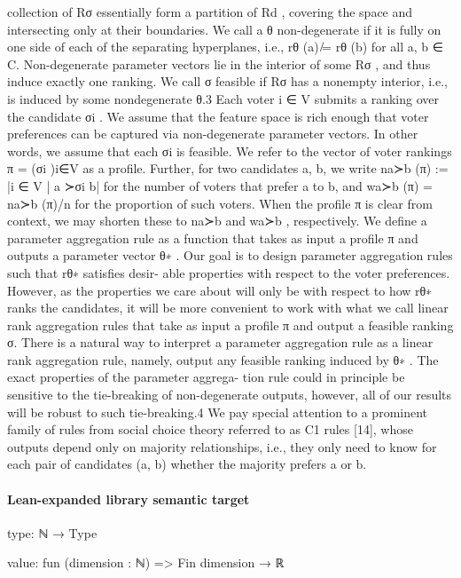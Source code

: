 \documentclass[10pt]{article}
\begin{document}
\begin{ReviewVerbatim}
collection of {Rσ } essentially form a partition of Rd , covering the space and intersecting only at
their boundaries.
We call a θ non-degenerate if it is fully on one side of each of the separating hyperplanes, i.e.,
rθ (a) ̸= rθ (b) for all a, b ∈ C. Non-degenerate parameter vectors lie in the interior of some Rσ ,
and thus induce exactly one ranking. We call σ feasible if Rσ has a nonempty interior, i.e., is induced
by some nondegenerate θ.3
Each voter i ∈ V submits a ranking over the candidate σi . We assume that the feature space is
rich enough that voter preferences can be captured via non-degenerate parameter vectors. In other
words, we assume that each σi is feasible. We refer to the vector of voter rankings π = (σi )i∈V as
a profile. Further, for two candidates a, b, we write na≻b (π) := |{i ∈ V | a ≻σi b}| for the number
of voters that prefer a to b, and wa≻b (π) = na≻b (π)/n for the proportion of such voters. When the
profile π is clear from context, we may shorten these to na≻b and wa≻b , respectively.
We define a parameter aggregation rule as a function that takes as input a profile π and outputs a
parameter vector θ∗ . Our goal is to design parameter aggregation rules such that rθ∗ satisfies desir-
able properties with respect to the voter preferences. However, as the properties we care about will
only be with respect to how rθ∗ ranks the candidates, it will be more convenient to work with what
we call linear rank aggregation rules that take as input a profile π and output a feasible ranking σ.
There is a natural way to interpret a parameter aggregation rule as a linear rank aggregation rule,
namely, output any feasible ranking induced by θ∗ . The exact properties of the parameter aggrega-
tion rule could in principle be sensitive to the tie-breaking of non-degenerate outputs, however, all
of our results will be robust to such tie-breaking.4
We pay special attention to a prominent family of rules from social choice theory referred to as C1
rules [14], whose outputs depend only on majority relationships, i.e., they only need to know for
each pair of candidates (a, b) whether the majority prefers a or b.
\end{ReviewVerbatim}



\paragraph{Lean-expanded library semantic target}
\begin{ReviewVerbatim}
type:
ℕ → Type

value:
fun (dimension : ℕ) => Fin dimension → ℝ
\end{ReviewVerbatim}
\end{document}
